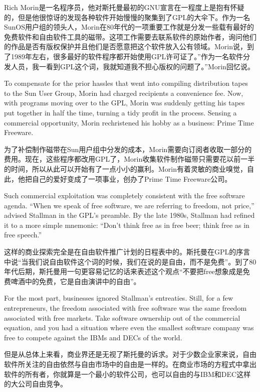 \ifdefined\chs
Rich Morin是一名程序员，他对斯托曼最初的GNU宣言在一程度上是抱有怀疑的，但是他很惊讶的发现各种软件开始慢慢的聚集到了GPL的大伞下。作为一名 SunOS用户组的领头人，Morin在80年代的一项重要工作就是分发一些载有最好的免费软件和自由软件工具的磁带。这项工作需要去联系软件的原始作者，询问他们的作品是否有版权保护并且他们是否愿意把这个软件放入公有领域。Morin说，到了1989年左右，很多最好的软件程序都开始使用GPL许可证了。”作为一名软件分发人员，我一看到GPL这个词，我就知道我不担心版权的问题了。”Morin回忆说。
\fi

\ifdefined\eng
To compensate for the prior hassles that went into compiling distribution tapes to the Sun User Group, Morin had charged recipients a convenience fee. Now, with programs moving over to the GPL, Morin was suddenly getting his tapes put together in half the time, turning a tidy profit in the process. Sensing a commercial opportunity, Morin rechristened his hobby as a business: Prime Time Freeware.
\fi

\ifdefined\chs
为了补偿制作磁带在Sun用户组中分发的成本，Morin需要向订阅者收取一部分的费用。现在，这些程序都改用GPL了，Morin收集软件制作磁带只需要花以前一半的时间，所以从此可以开始有了一点小小的赢利。Morin有着灵敏的商业嗅觉，自此，他把自己的爱好变成了一项事业，创办了Prime Time Freeware公司。
\fi

\ifdefined\eng
Such commercial exploitation was completely consistent with the free software agenda. ``When we speak of free software, we are referring to freedom, not price,'' advised Stallman in the GPL's preamble. By the late 1980s, Stallman had refined it to a more simple mnemonic: ``Don't think free as in free beer; think free as in free speech.''
\fi

\ifdefined\chs
这样的商业探索完全是在自由软件推广计划的日程表中的。斯托曼在GPL的序言中说“当我们说自由软件这个词的时候，我们在说的是自由，而不是免费”。到了80年代后期，斯托曼用一句更容易记忆的话来表述这个观点“不要把free想象成是免费啤酒中的免费，它是自由演讲中的自由”。
\fi

\ifdefined\eng
For the most part, businesses ignored Stallman's entreaties. Still, for a few entrepreneurs, the freedom associated with free software was the same freedom associated with free markets. Take software ownership out of the commercial equation, and you had a situation where even the smallest software company was free to compete against the IBMs and DECs of the world.
\fi

\ifdefined\chs
但是从总体上来看，商业界还是无视了斯托曼的诉求。对于少数企业家来说，自由软件所关注的自由依然与自由市场中的自由是一样的。在商业市场的方程式中拿出软件的所有者，你就算是一个最小的软件公司，也可以自由的与IBM和DEC这样的大公司自由竞争。
\fi

